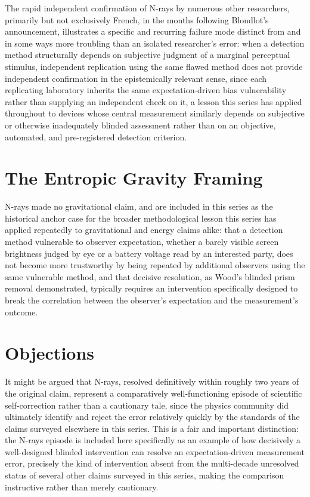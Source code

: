 \documentclass[11pt]{article}
\begin{document}
The rapid independent confirmation of N-rays by numerous other researchers, primarily but not exclusively French, in the months following Blondlot's announcement, illustrates a specific and recurring failure mode distinct from and in some ways more troubling than an isolated researcher's error: when a detection method structurally depends on subjective judgment of a marginal perceptual stimulus, independent replication using the same flawed method does not provide independent confirmation in the epistemically relevant sense, since each replicating laboratory inherits the same expectation-driven bias vulnerability rather than supplying an independent check on it, a lesson this series has applied throughout to devices whose central measurement similarly depends on subjective or otherwise inadequately blinded assessment rather than on an objective, automated, and pre-registered detection criterion.

\section{The Entropic Gravity Framing}

N-rays made no gravitational claim, and are included in this series as the historical anchor case for the broader methodological lesson this series has applied repeatedly to gravitational and energy claims alike: that a detection method vulnerable to observer expectation, whether a barely visible screen brightness judged by eye or a battery voltage read by an interested party, does not become more trustworthy by being repeated by additional observers using the same vulnerable method, and that decisive resolution, as Wood's blinded prism removal demonstrated, typically requires an intervention specifically designed to break the correlation between the observer's expectation and the measurement's outcome.

\section{Objections}

It might be argued that N-rays, resolved definitively within roughly two years of the original claim, represent a comparatively well-functioning episode of scientific self-correction rather than a cautionary tale, since the physics community did ultimately identify and reject the error relatively quickly by the standards of the claims surveyed elsewhere in this series. This is a fair and important distinction: the N-rays episode is included here specifically as an example of how decisively a well-designed blinded intervention can resolve an expectation-driven measurement error, precisely the kind of intervention absent from the multi-decade unresolved status of several other claims surveyed in this series, making the comparison instructive rather than merely cautionary.
\end{document}
